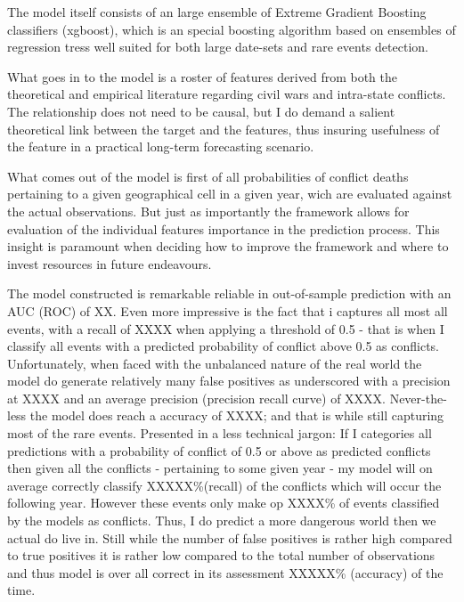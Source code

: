 \documentclass[a4paper]{article}
\begin{document}
The model itself consists of an large ensemble of Extreme Gradient Boosting classifiers (xgboost), which is an special boosting algorithm based on ensembles of regression tress well suited for both large date-sets and rare events detection.\par

What goes in to the model is a roster of features derived from both the theoretical and empirical literature regarding civil wars and intra-state conflicts. The relationship does not need to be causal, but I do demand a salient theoretical link between the target and the features, thus insuring usefulness of the feature in a practical long-term forecasting scenario.\par

What comes out of the model is first of all probabilities of conflict deaths pertaining to a given geographical cell in a given year, wich are evaluated against the actual observations. But just as importantly the framework allows for evaluation of the individual features importance in the prediction process. This insight is paramount when deciding how to improve the framework and where to invest resources in future endeavours.\par


The model constructed is remarkable reliable in out-of-sample prediction with an AUC (ROC) of XX. Even more impressive is the fact that i captures all most all events, with a recall of XXXX when applying a threshold of 0.5 - that is when I classify all events with a predicted probability of conflict above 0.5 as conflicts. Unfortunately, when faced with the unbalanced nature of the real world the model do generate relatively many false positives as underscored with a precision at XXXX and an average precision (precision recall curve) of XXXX. Never-the-less the model does reach a accuracy of XXXX; and that is while still capturing most of the rare events. Presented in a less technical jargon: If I categories all predictions with a probability of conflict of 0.5 or above as predicted conflicts then given all the conflicts - pertaining to some given year - my model will on average correctly classify XXXXX\%(recall) of the conflicts which will occur the following year. However these events only make op XXXX\% of events classified by the models as conflicts. Thus, I do predict a more dangerous world then we actual do live in. Still while the number of false positives is rather high compared to true positives it is rather low compared to the total number of observations and thus model is over all correct in its assessment XXXXX\% (accuracy) of the time.\par
\end{document}
